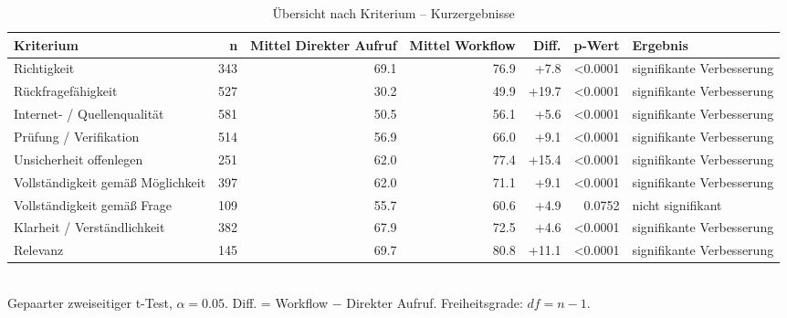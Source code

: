 \begin{table}[htbp]
\centering
\caption{Übersicht nach Kriterium -- Kurzergebnisse}
\begin{tabular}{lrrrrrl}
\toprule
Kriterium & n & Mittel Direkter Aufruf & Mittel Workflow & Diff. & p-Wert & Ergebnis \\
\midrule
Richtigkeit & 343 & 69.1 & 76.9 & +7.8 & <0.0001 & signifikante Verbesserung \\
Rückfragefähigkeit & 527 & 30.2 & 49.9 & +19.7 & <0.0001 & signifikante Verbesserung \\
Internet- / Quellenqualität & 581 & 50.5 & 56.1 & +5.6 & <0.0001 & signifikante Verbesserung \\
Prüfung / Verifikation & 514 & 56.9 & 66.0 & +9.1 & <0.0001 & signifikante Verbesserung \\
Unsicherheit offenlegen & 251 & 62.0 & 77.4 & +15.4 & <0.0001 & signifikante Verbesserung \\
Vollständigkeit gemäß Möglichkeit & 397 & 62.0 & 71.1 & +9.1 & <0.0001 & signifikante Verbesserung \\
Vollständigkeit gemäß Frage & 109 & 55.7 & 60.6 & +4.9 & 0.0752 & nicht signifikant \\
Klarheit / Verständlichkeit & 382 & 67.9 & 72.5 & +4.6 & <0.0001 & signifikante Verbesserung \\
Relevanz & 145 & 69.7 & 80.8 & +11.1 & <0.0001 & signifikante Verbesserung \\
\bottomrule
\end{tabular}
\\[2mm]
\footnotesize Gepaarter zweiseitiger t-Test, $\alpha=0.05$. Diff. = Workflow $-$ Direkter Aufruf. Freiheitsgrade: $df=n-1$.
\end{table}
